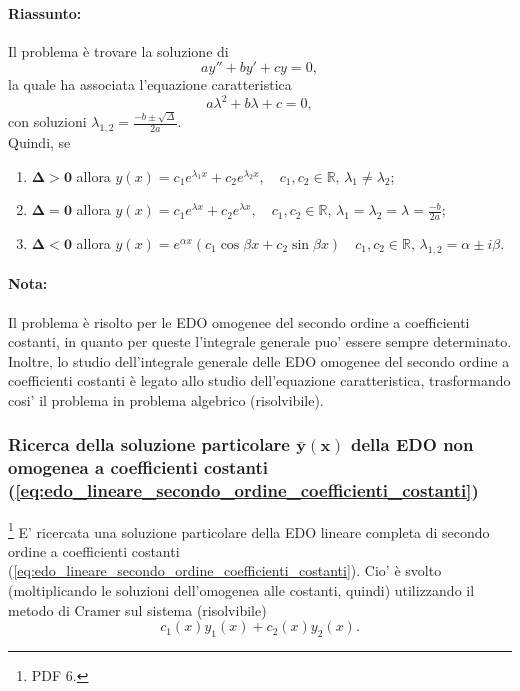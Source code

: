 \paragraph{Riassunto:} Il problema è trovare la soluzione di
\begin{equation*}
	ay'' + b y' + cy = 0,
\end{equation*}
la quale ha associata l'equazione caratteristica
\begin{equation*}
	a\lambda^2 + b\lambda + c = 0,
\end{equation*}
con soluzioni $\lambda_{1,2}=\frac{-b\pm\sqrt{\Delta}}{2a}$.\\
Quindi, se
\begin{enumerate}
	\item $\boldsymbol{\Delta>0}$ allora $y(x) = c_1 e^{\lambda_1x} + c_2e^{\lambda_2 x},\quad c_1,c_2\in\mathbb{R},\, \lambda_1 \neq \lambda_2$;
	\item $\boldsymbol{\Delta = 0}$ allora $y(x) = c_1 e^{\lambda x} + c_2e^{\lambda x},\quad c_1,c_2\in\mathbb{R},\, \lambda_1 = \lambda_2=\lambda=\frac{-b}{2a}$;
	\item $\boldsymbol{\Delta<0}$ allora $y(x) = e^{\alpha x}(c_1\cos\beta x + c_2 \sin\beta x)\quad c_1,c_2\in\mathbb{R},\, \lambda_{1,2} = \alpha\pm i\beta$.
\end{enumerate}

\paragraph{Nota:} Il problema è risolto per le EDO omogenee del secondo ordine a coefficienti costanti, in quanto per queste l'integrale generale puo' essere sempre determinato. Inoltre, lo studio dell'integrale generale delle EDO omogenee del secondo ordine a coefficienti costanti è legato allo studio dell'equazione caratteristica, trasformando cosi' il problema in problema algebrico (risolvibile).

\subsubsection{Ricerca della soluzione particolare \texorpdfstring{$\boldsymbol{\bar y(x)}$}{y(x)} della EDO non omogenea a coefficienti costanti (\ref{eq:edo_lineare_secondo_ordine_coefficienti_costanti})}
\footnote{PDF 6.}
E' ricercata una soluzione particolare della EDO lineare completa di secondo ordine a coefficienti costanti (\ref{eq:edo_lineare_secondo_ordine_coefficienti_costanti}). Cio' è svolto (moltiplicando le soluzioni dell'omogenea alle costanti, quindi) utilizzando il metodo di Cramer sul sistema (risolvibile)
\begin{equation*}
	c_1(x)y_1(x) + c_2(x)y_2(x).
\end{equation*}

